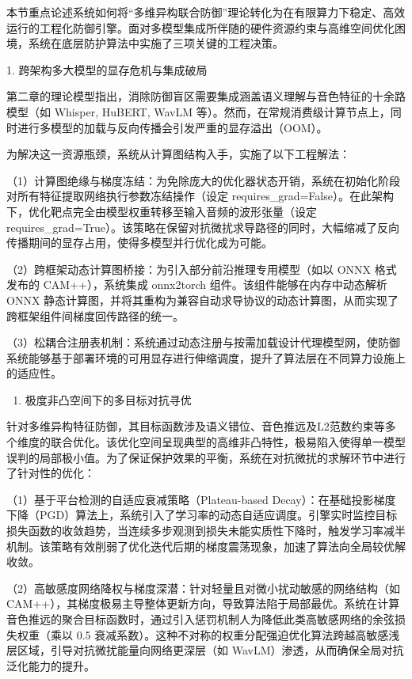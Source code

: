 本节重点论述系统如何将``多维异构联合防御''理论转化为在有限算力下稳定、高效运行的工程化防御引擎。面对多模型集成所伴随的硬件资源约束与高维空间优化困境，系统在底层防护算法中实施了三项关键的工程决策。

1. 跨架构多大模型的显存危机与集成破局

第二章的理论模型指出，消除防御盲区需要集成涵盖语义理解与音色特征的十余路模型（如
Whisper, HuBERT, WavLM
等）。然而，在常规消费级计算节点上，同时进行多模型的加载与反向传播会引发严重的显存溢出（OOM）。

为解决这一资源瓶颈，系统从计算图结构入手，实施了以下工程解法：

（1）计算图绝缘与梯度冻结：为免除庞大的优化器状态开销，系统在初始化阶段对所有特征提取网络执行参数冻结操作（设定
requires\_grad=False）。在此架构下，优化靶点完全由模型权重转移至输入音频的波形张量（设定
requires\_grad=True）。该策略在保留对抗微扰求导路径的同时，大幅缩减了反向传播期间的显存占用，使得多模型并行优化成为可能。

（2）跨框架动态计算图桥接：为引入部分前沿推理专用模型（如以 ONNX
格式发布的 CAM++），系统集成 onnx2torch 组件。该组件能够在内存中动态解析
ONNX
静态计算图，并将其重构为兼容自动求导协议的动态计算图，从而实现了跨框架组件间梯度回传路径的统一。

（3）松耦合注册表机制：系统通过动态注册与按需加载设计代理模型网，使防御系统能够基于部署环境的可用显存进行伸缩调度，提升了算法层在不同算力设施上的适应性。

\begin{enumerate}
\def\labelenumi{\arabic{enumi}.}
\setcounter{enumi}{1}
\item
  极度非凸空间下的多目标对抗寻优
\end{enumerate}

针对多维异构特征防御，其目标函数涉及语义错位、音色推远及L2范数约束等多个维度的联合优化。该优化空间呈现典型的高维非凸特性，极易陷入使得单一模型误判的局部极小值。为了保证保护效果的平衡，系统在对抗微扰的求解环节中进行了针对性的优化：

（1）基于平台检测的自适应衰减策略（Plateau-based
Decay）：在基础投影梯度下降（PGD）算法上，系统引入了学习率的动态自适应调度。引擎实时监控目标损失函数的收敛趋势，当连续多步观测到损失未能实质性下降时，触发学习率减半机制。该策略有效削弱了优化迭代后期的梯度震荡现象，加速了算法向全局较优解收敛。

（2）高敏感度网络降权与梯度深潜：针对轻量且对微小扰动敏感的网络结构（如
CAM++），其梯度极易主导整体更新方向，导致算法陷于局部最优。系统在计算音色推远的聚合目标函数时，通过引入惩罚机制人为降低此类高敏感网络的余弦损失权重（乘以
0.5
衰减系数）。这种不对称的权重分配强迫优化算法跨越高敏感浅层区域，引导对抗微扰能量向网络更深层（如
WavLM）渗透，从而确保全局对抗泛化能力的提升。

